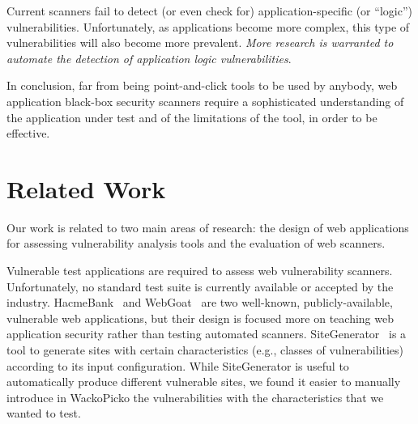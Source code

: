 Current scanners fail to detect (or even check for) application-specific
(or ``logic'') vulnerabilities. 
Unfortunately, as applications become more complex, this type of
vulnerabilities will also become more prevalent.
{\em More research is warranted to automate the detection of application
logic vulnerabilities}.

In conclusion, far from being point-and-click tools to be used by
anybody, web application black-box security scanners require a
sophisticated understanding of the application under test and of the
limitations of the tool, in order to be effective.


\section{Related Work}
\label{sec:related_work}

Our work is related to two main areas of research: the design of 
web applications for assessing vulnerability analysis tools and the
evaluation of web scanners.

Vulnerable test applications are required to assess 
web vulnerability scanners. Unfortunately, no standard
test suite is currently available or accepted by the industry. 
HacmeBank~\cite{hacme_bank} and WebGoat~\cite{owasp-webgoat} are two
well-known, publicly-available, vulnerable web applications, but their
design is focused more on teaching web application security rather
than testing automated scanners. 
SiteGenerator~\cite{owasp_sitegenerator} is a tool to
generate sites with certain characteristics (e.g., classes of
vulnerabilities) according to its input configuration. 
While SiteGenerator is useful to automatically produce different vulnerable
sites, we found it easier to manually introduce in Wacko\-Picko the
vulnerabilities with the characteristics that we wanted to test.

